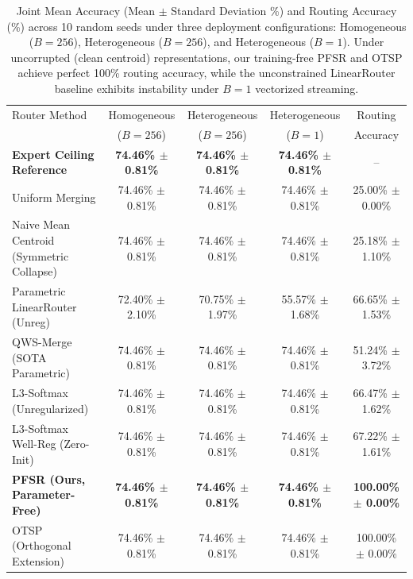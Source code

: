 \begin{table}[t]
\caption{Joint Mean Accuracy (Mean $\pm$ Standard Deviation \%) and Routing Accuracy (\%) across 10 random seeds under three deployment configurations: Homogeneous ($B=256$), Heterogeneous ($B=256$), and Heterogeneous ($B=1$). Under uncorrupted (clean centroid) representations, our training-free PFSR and OTSP achieve perfect 100\% routing accuracy, while the unconstrained LinearRouter baseline exhibits instability under $B=1$ vectorized streaming.}
\label{tab:main_results}
\vskip 0.15in
\begin{center}
\begin{small}
\begin{sc}
\setlength{\tabcolsep}{3.5pt}
\begin{tabular}{lcccc}
\toprule
Router Method & Homogeneous & Heterogeneous & Heterogeneous & Routing \\
& ($B=256$) & ($B=256$) & ($B=1$) & Accuracy \\
\midrule
\textbf{Expert Ceiling Reference} & \textbf{74.46\% $\pm$ 0.81\%} & \textbf{74.46\% $\pm$ 0.81\%} & \textbf{74.46\% $\pm$ 0.81\%} & -- \\
\midrule
Uniform Merging & 74.46\% $\pm$ 0.81\% & 74.46\% $\pm$ 0.81\% & 74.46\% $\pm$ 0.81\% & 25.00\% $\pm$ 0.00\% \\
Naive Mean Centroid (Symmetric Collapse) & 74.46\% $\pm$ 0.81\% & 74.46\% $\pm$ 0.81\% & 74.46\% $\pm$ 0.81\% & 25.18\% $\pm$ 1.10\% \\
Parametric LinearRouter (Unreg) & 72.40\% $\pm$ 2.10\% & 70.75\% $\pm$ 1.97\% & 55.57\% $\pm$ 1.68\% & 66.65\% $\pm$ 1.53\% \\
QWS-Merge (SOTA Parametric) & 74.46\% $\pm$ 0.81\% & 74.46\% $\pm$ 0.81\% & 74.46\% $\pm$ 0.81\% & 51.24\% $\pm$ 3.72\% \\
L3-Softmax (Unregularized) & 74.46\% $\pm$ 0.81\% & 74.46\% $\pm$ 0.81\% & 74.46\% $\pm$ 0.81\% & 66.47\% $\pm$ 1.62\% \\
L3-Softmax Well-Reg (Zero-Init) & 74.46\% $\pm$ 0.81\% & 74.46\% $\pm$ 0.81\% & 74.46\% $\pm$ 0.81\% & 67.22\% $\pm$ 1.61\% \\
\textbf{PFSR (Ours, Parameter-Free)} & \textbf{74.46\% $\pm$ 0.81\%} & \textbf{74.46\% $\pm$ 0.81\%} & \textbf{74.46\% $\pm$ 0.81\%} & \textbf{100.00\% $\pm$ 0.00\%} \\
\midrule
OTSP (Orthogonal Extension) & 74.46\% $\pm$ 0.81\% & 74.46\% $\pm$ 0.81\% & 74.46\% $\pm$ 0.81\% & 100.00\% $\pm$ 0.00\% \\
\bottomrule
\end{tabular}
\end{sc}
\end{small}
\end{center}
\vskip -0.1in
\end{table}

